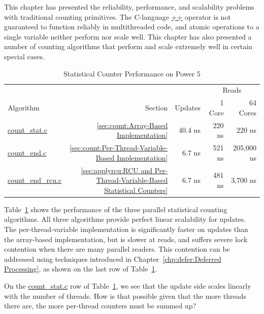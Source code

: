 This chapter has presented the reliability, performance, and
scalability problems with traditional counting primitives.
The C-language \url{++} operator is not guaranteed to function reliably in
multithreaded code, and atomic operations to a single variable neither
perform nor scale well.
This chapter has also presented a number of counting algorithms that
perform and scale extremely well in certain special cases.

\begin{table}
\begin{center}
\begin{tabular}{l|r|r|r|r}
	& & & \multicolumn{2}{|c}{Reads} \\
	\cline{4-5}
	Algorithm & Section & Updates & 1 Core & 64 Cores \\
	\hline
	\hline
	\url{count_stat.c} & \ref{sec:count:Array-Based Implementation} &
		40.4 ns & 220 ns & 220 ns \\
	\url{count_end.c} & \ref{sec:count:Per-Thread-Variable-Based Implementation} &
		6.7 ns & 521 ns & 205,000 ns \\
	\url{count_end_rcu.c} & \ref{sec:applyrcu:RCU and Per-Thread-Variable-Based Statistical Counters} &
		6.7 ns & 481 ns & 3,700 ns \\
\end{tabular}
\end{center}
\caption{Statistical Counter Performance on Power 5}
\label{tab:count:Statistical Counter Performance on Power 5}
\end{table}

Table~\ref{tab:count:Statistical Counter Performance on Power 5}
shows the performance of the three parallel statistical counting
algorithms.
All three algorithms provide perfect linear scalability for updates.
The per-thread-variable implementation is significantly faster on
updates than the array-based implementation, but is slower at reads,
and suffers severe lock contention when there are many parallel readers.
This contention can be addressed using techniques introduced in
Chapter~\ref{chp:defer:Deferred Processing},
as shown on the last row of
Table~\ref{tab:count:Statistical Counter Performance on Power 5}.

\QuickQuiz{}
	On the \url{count_stat.c} row of
	Table~\ref{tab:count:Statistical Counter Performance on Power 5},
	we see that the update side scales linearly with the number of
	threads.
	How is that possible given that the more threads there are,
	the more per-thread counters must be summed up?
 \QuickQuizEnd

